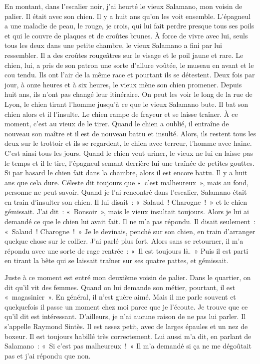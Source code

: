 \documentclass[french,twoside]{book} %
\begin{document}
En montant, dans l’escalier noir, j’ai heurté le vieux Salamano, mon voisin de palier. Il était avec son chien. Il y a huit ans qu’on les voit ensemble. L'épagneul a une maladie de peau, le rouge, je crois, qui lui fait perdre presque tous ses poils et qui le couvre de plaques et de croûtes brunes. À force de vivre avec lui, seuls tous les deux dans une petite chambre, le vieux Salamano a fini par lui ressembler. Il a des croûtes rougeâtres sur le visage et le poil jaune et rare. Le chien, lui, a pris de son patron une sorte d’allure voûtée, le museau en avant et le cou tendu. Ils ont l’air de la même race et pourtant ils se détestent. Deux fois par jour, à onze heures et à six heures, le vieux mène son chien promener. Depuis huit ans, ils n’ont pas changé leur itinéraire. On peut les voir le long de la rue de Lyon, le chien tirant l’homme jusqu’à ce que le vieux Salamano bute. Il bat son chien alors et il l’insulte. Le chien rampe de frayeur et se laisse traîner. À ce moment, c’est au vieux de le tirer. Quand le chien a oublié, il entraîne de nouveau son maître et il est de nouveau battu et insulté. Alors, ils restent tous les deux sur le trottoir et ils se regardent, le chien avec terreur, l’homme avec haine. C'est ainsi tous les jours. Quand le chien veut uriner, le vieux ne lui en laisse pas le temps et il le tire, l’épagneul semant derrière lui une traînée de petites gouttes. Si par hasard le chien fait dans la chambre, alors il est encore battu. Il y a huit ans que cela dure. Céleste dit toujours que « c’est malheureux », mais au fond, personne ne peut savoir. Quand je l’ai rencontré dans l’escalier, Salamano était en train d’insulter son chien. Il lui disait : « Salaud ! Charogne ! » et le chien gémissait. J'ai dit : « Bonsoir », mais le vieux insultait toujours. Alors je lui ai demandé ce que le chien lui avait fait. Il ne m’a pas répondu. Il disait seulement : « Salaud ! Charogne ! » Je le devinais, penché sur son chien, en train d’arranger quelque chose sur le collier. J'ai parlé plus fort. Alors sans se retourner, il m’a répondu avec une sorte de rage rentrée : « Il est toujours là. » Puis il est parti en tirant la bête qui se laissait traîner sur ses quatre pattes, et gémissait.\par
Juste à ce moment est entré mon deuxième voisin de palier. Dans le quartier, on dit qu’il vit des femmes. Quand on lui demande son métier, pourtant, il est « magasinier ». En général, il n’est guère aimé. Mais il me parle souvent et quelquefois il passe un moment chez moi parce que je l’écoute. Je trouve que ce qu’il dit est intéressant. D'ailleurs, je n’ai aucune raison de ne pas lui parler. Il s’appelle Raymond Sintès. Il est assez petit, avec de larges épaules et un nez de boxeur. Il est toujours habillé très correctement. Lui aussi m’a dit, en parlant de Salamano : « Si c’est pas malheureux ! » Il m’a demandé si ça ne me dégoûtait pas et j’ai répondu que non.\par
\end{document}
